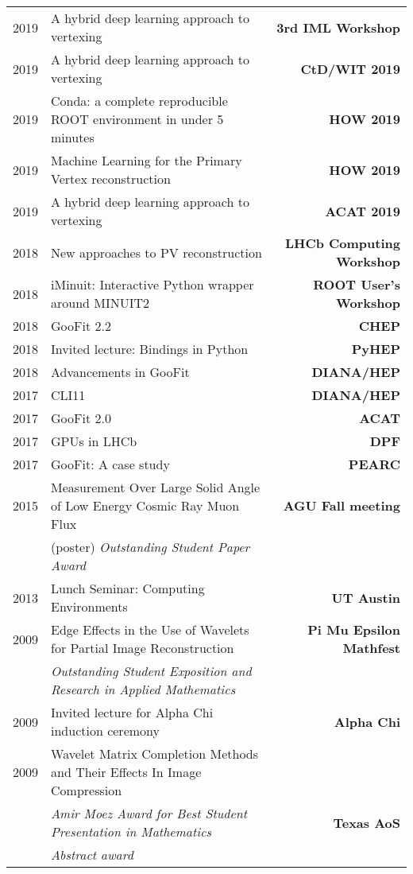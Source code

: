 \documentclass[10pt,letterpaper]{moderncv}
\begin{document}
\begin{tabularx}{\textwidth}{p{.33in}X>{\bfseries}r}
    2019 & A hybrid deep learning approach to vertexing & 3rd IML Workshop \\
    2019 & A hybrid deep learning approach to vertexing & CtD/WIT 2019 \\
    2019 & Conda: a complete reproducible ROOT environment in under 5 minutes & HOW 2019 \\
    2019 & Machine Learning for the Primary Vertex reconstruction & HOW 2019 \\
    2019 & A hybrid deep learning approach to vertexing & ACAT 2019 \\ %
	2018 & New approaches to PV reconstruction & LHCb Computing Workshop \\ %
	2018 & iMinuit: Interactive Python wrapper around MINUIT2 & ROOT User's Workshop \\  %
	2018 & GooFit 2.2 & CHEP \\ %
	2018 & Invited lecture: Bindings in Python & PyHEP  \\
    2018 & Advancements in GooFit & DIANA/HEP \\
	2017 & CLI11 & DIANA/HEP \\
	2017 & GooFit 2.0 & ACAT \\
	2017 & GPUs in LHCb & DPF \\ %
	2017 & GooFit: A case study & PEARC \\


	2015 & Measurement Over Large Solid Angle of Low Energy Cosmic Ray Muon Flux &  AGU Fall meeting \\
	 & (poster) \emph{Outstanding Student Paper Award} & \\
	 2013 & Lunch Seminar: Computing Environments & UT Austin \\
	 2009 & Edge Effects in the Use of Wavelets for Partial Image Reconstruction & Pi Mu Epsilon Mathfest \\
	 & \emph{Outstanding Student Exposition and Research in Applied Mathematics} & \\

	 2009 & Invited lecture for Alpha Chi induction ceremony & Alpha Chi  \\

	 2009 & Wavelet Matrix Completion Methods and Their Effects In Image Compression &  \\
	  & \emph{Amir Moez Award for Best Student Presentation in Mathematics} & Texas AoS \\
	  & \emph{Abstract award} & \\


\end{tabularx}
\end{document}
